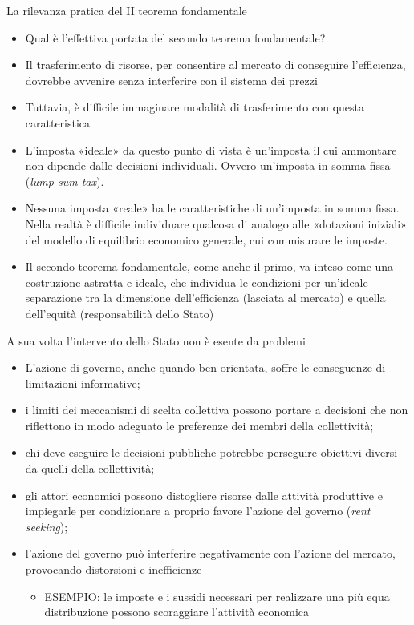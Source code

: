 \documentclass[aspectratio=149,11pt]{beamer}
\begin{document}
\begin{frame}{La rilevanza pratica del II teorema fondamentale}
\begin{itemize}
\item Qual è l’effettiva portata del secondo teorema fondamentale?
\item Il trasferimento di risorse, per consentire al mercato di conseguire
l’efficienza, dovrebbe avvenire senza interferire con il sistema dei prezzi
\item Tuttavia, è difficile immaginare modalità di trasferimento con questa caratteristica
\item L’imposta «ideale» da questo punto di vista è un’imposta il cui ammontare
non dipende dalle decisioni individuali. Ovvero un’imposta in somma fissa
(\emph{lump sum tax}).
\item Nessuna imposta «reale» ha le caratteristiche di un’imposta in somma
fissa. Nella realtà è difficile individuare qualcosa di analogo alle
«dotazioni iniziali» del modello di equilibrio economico generale, cui
commisurare le imposte.
\item Il secondo teorema fondamentale, come anche il primo, va inteso come una
\alert{costruzione astratta e ideale}, che individua le condizioni per un’ideale
separazione tra la dimensione dell’efficienza (lasciata al mercato) e quella
dell’equità (responsabilità dello Stato)
\end{itemize}
\end{frame}

\begin{frame}{A sua volta l'intervento dello Stato non è esente da problemi}
\begin{itemize}
\item L'azione di governo, anche quando ben orientata, soffre le conseguenze di
limitazioni informative;
\item i limiti dei meccanismi di scelta collettiva possono portare a decisioni che
non riflettono in modo adeguato le preferenze dei membri della collettività;
\item chi deve eseguire le decisioni pubbliche potrebbe perseguire obiettivi
diversi da quelli della collettività;
\item gli attori economici possono distogliere risorse dalle attività produttive e
impiegarle per condizionare a proprio favore l’azione del governo (\emph{rent
seeking});
\item l'azione del governo può interferire negativamente con l'azione del mercato,
provocando distorsioni e inefficienze
\begin{itemize}
\item ESEMPIO: le imposte e i sussidi necessari per realizzare una più equa
distribuzione possono scoraggiare l'attività economica
\end{itemize}
\end{itemize}
\end{frame}
\end{document}
